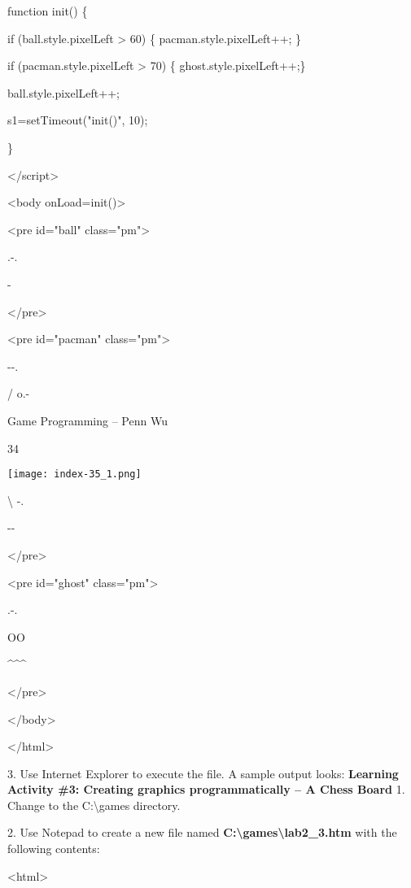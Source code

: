 \documentclass[
]{article}
\begin{document}
function init() \{

if (ball.style.pixelLeft \textgreater{} 60) \{ pacman.style.pixelLeft++;
\}

if (pacman.style.pixelLeft \textgreater{} 70) \{
ghost.style.pixelLeft++;\}

ball.style.pixelLeft++;

s1=setTimeout("init()", 10);

\}

\textless/script\textgreater{}

\textless body onLoad=init()\textgreater{}

\textless pre id="ball" class="pm"\textgreater{}

.-.

\textquotesingle-\textquotesingle{}

\textless/pre\textgreater{}

\textless pre id="pacman" class="pm"\textgreater{}

-\/-.

/ o.-\textquotesingle{}

Game Programming -- Penn Wu

34

\protect\hypertarget{index_split_003.htmlux5cux23p35}{}{}\texttt{[image: index-35\_1.png]}

\textbackslash{} \textquotesingle-.

\textquotesingle-\/-\textquotesingle{}

\textless/pre\textgreater{}

\textless pre id="ghost" class="pm"\textgreater{}

.-.

\textbar{} OO\textbar{}

\textbar{} \textbar{}

\textquotesingle\^{}\^{}\^{}\textquotesingle{}

\textless/pre\textgreater{}

\textless/body\textgreater{}

\textless/html\textgreater{}

3. Use Internet Explorer to execute the file. A sample output looks:
\textbf{Learning Activity \#3: Creating graphics programmatically -- A
Chess Board} 1. Change to the C:\textbackslash games directory.

2. Use Notepad to create a new file named
\textbf{C:\textbackslash games\textbackslash lab2\_3.htm} with the
following contents:

\textless html\textgreater{}
\end{document}
